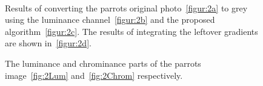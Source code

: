 \documentclass[conference]{IEEEtran}
\begin{document}
 
\begin{figure}[t]  
  \centering
  \\
\caption{Results of converting the parrots original photo~\ref{figur:2a} to grey using the luminance channel~\ref{figur:2b} and the proposed algorithm~\ref{figur:2c}. The results of integrating the leftover gradients are shown in~\ref{figur:2d}.}
\label{fig:2}
\end{figure}
\begin{figure}[t]  
  \centering
\caption{The luminance and chrominance parts of the parrots image~\ref{fig:2Lum} and~\ref{fig:2Chrom} respectively.}
\label{fig:2E}
\end{figure}
\end{document}
